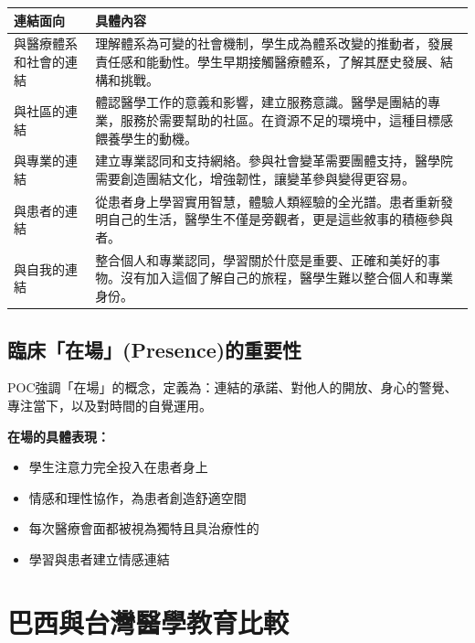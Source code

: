 \documentclass[12pt,a4paper]{article}
\begin{document}
\begin{longtable}{p{3cm}|p{11cm}}
    \toprule
    \textbf{連結面向} & \textbf{具體內容} \\
    \midrule
    \endhead
    與醫療體系和社會的連結 & 
    理解體系為可變的社會機制，學生成為體系改變的推動者，發展責任感和能動性。學生早期接觸醫療體系，了解其歷史發展、結構和挑戰。 \\
    \midrule
    與社區的連結 & 
    體認醫學工作的意義和影響，建立服務意識。醫學是團結的專業，服務於需要幫助的社區。在資源不足的環境中，這種目標感餵養學生的動機。 \\
    \midrule
    與專業的連結 & 
    建立專業認同和支持網絡。參與社會變革需要團體支持，醫學院需要創造團結文化，增強韌性，讓變革參與變得更容易。 \\
    \midrule
    與患者的連結 & 
    從患者身上學習實用智慧，體驗人類經驗的全光譜。患者重新發明自己的生活，醫學生不僅是旁觀者，更是這些敘事的積極參與者。 \\
    \midrule
    與自我的連結 & 
    整合個人和專業認同，學習關於什麼是重要、正確和美好的事物。沒有加入這個了解自己的旅程，醫學生難以整合個人和專業身份。 \\
    \bottomrule
\end{longtable}

\subsection{臨床「在場」(Presence)的重要性}
POC強調「在場」的概念，定義為：連結的承諾、對他人的開放、身心的警覺、專注當下，以及對時間的自覺運用。

\textbf{在場的具體表現：}
\begin{itemize}[nosep]
    \item 學生注意力完全投入在患者身上
    \item 情感和理性協作，為患者創造舒適空間
    \item 每次醫療會面都被視為獨特且具治療性的
    \item 學習與患者建立情感連結
\end{itemize}

\section{巴西與台灣醫學教育比較}
\end{document}
